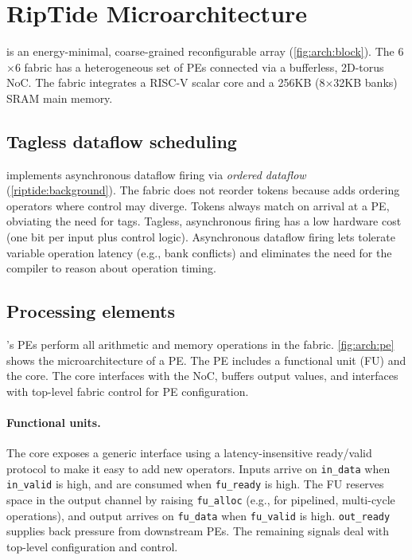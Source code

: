\section{RipTide Microarchitecture}
\label{riptide:arch}

\riptide is an energy-minimal, \ulp coarse-grained reconfigurable array (\autoref{fig:arch:block}).
% 
The 6$\times$6 fabric has a
heterogeneous set of PEs connected via a bufferless, 2D-torus NoC.
% 
The fabric integrates a RISC-V scalar core and a 256KB
(8$\times$32KB banks) SRAM main memory.

\subsection{Tagless dataflow scheduling}

\riptide implements asynchronous dataflow firing via \emph{ordered dataflow} (\autoref{riptide:background}).
%
The fabric does not reorder tokens because \riptide adds ordering operators where
control may diverge.
%
Tokens always match on arrival at a PE, obviating the need for tags.
%
Tagless, asynchronous firing has a low hardware cost (one bit per input plus
control logic).
%
Asynchronous dataflow firing lets \riptide tolerate variable operation latency
(e.g., bank conflicts) and eliminates the need for the compiler to reason about
operation timing.

\subsection{Processing elements}
\riptide's PEs perform all arithmetic and memory operations in the fabric.
%
\autoref{fig:arch:pe} shows the microarchitecture of a PE.
% 
The PE includes a functional unit (FU) and the \textmu core.
% 
The \textmu core interfaces with the NoC, buffers
output values, and interfaces with top-level fabric control for PE configuration.

\paragraph{Functional units.}
The \textmu core exposes a generic interface using a
latency-insensitive ready/valid protocol to make it easy to add new
operators.
%
Inputs arrive on {\tt in\_data} when {\tt in\_valid} is high,
and are consumed when {\tt fu\_ready} is high.
%
The FU reserves space in the output channel by raising {\tt fu\_alloc}
(e.g., for pipelined, multi-cycle operations),
and output arrives on {\tt fu\_data} when {\tt fu\_valid} is high.
%
{\tt out\_ready} supplies back pressure from downstream PEs.
%
The remaining signals deal with top-level configuration and control.

